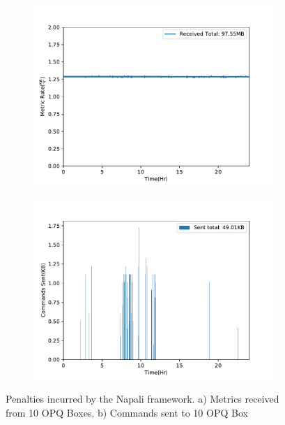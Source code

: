 \begin{figure}[h]
    \centering
    \begin{subfigure}{.5\textwidth}
        \centering
        \includegraphics[width=1\linewidth]{img/napali_eval/napali_metric_bandwidth.pdf}
        \caption{}
        \label{expdes:fig:napali_metric_bandwidth}
    \end{subfigure}%
    \begin{subfigure}{.5\textwidth}
        \centering
        \includegraphics[width=1\linewidth]{img/napali_eval/napali_cmd_bandwidth.pdf}
        \caption{}
        \label{expdes:fig:napali_cmd_bandwidth}
    \end{subfigure}
    \caption{Penalties incurred by the Napali framework.
    a) Metrics received from 10 OPQ Boxes.
    b) Commands sent to 10 OPQ Box }
    \label{expdes:fig:napali_bandwidth_penalty}
\end{figure}


